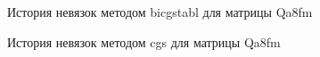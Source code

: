 \begin{figure}
    \renewcommand{\figurename}{Рисунок}
    \caption{История невязок методом bicgstabl для матрицы Qa8fm}
    \label{fig:image}
\end{figure}

\begin{figure}
    \renewcommand{\figurename}{Рисунок}
    \caption{История невязок методом cgs для матрицы Qa8fm}
    \label{fig:image}
\end{figure}

